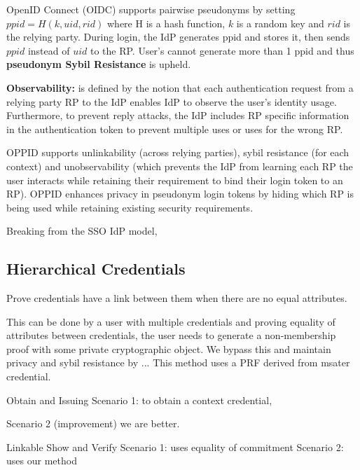 OpenID Connect (OIDC) supports pairwise pseudonyms by setting $ppid = H(k, uid, rid)$ where H is a hash function, $k$ is a random key and $rid$ is the relying party. During login, the IdP generates ppid and stores it, then sends $ppid$ instead of $uid$ to the RP. User's cannot generate more than 1 ppid and thus \textbf{pseudonym Sybil Resistance} is upheld. 

\textbf{Observability: } is defined by the notion that each authentication request from a relying party RP to the IdP enables IdP to observe the user's identity usage. Furthermore, to prevent reply attacks, the IdP includes RP specific information in the authentication token to prevent multiple uses or uses for the wrong RP.


OPPID \cite{kroschewski_oppid_2024} supports unlinkability (across relying parties), sybil resistance (for each context) and unobservability (which prevents the IdP from learning each RP the user interacts while retaining their requirement to bind their login token to an RP). OPPID enhances privacy in pseudonym login tokens by hiding which RP is being used while retaining existing security requirements.

Breaking from the SSO IdP model, 











\subsection{Hierarchical Credentials}





Prove credentials have a link between them when there are no equal attributes.


This can be done by a user with multiple credentials and proving equality of attributes between credentials, the user needs to generate a non-membership proof with some private cryptographic object. 
We bypass this and maintain privacy and sybil resistance by ...
This method uses a PRF derived from msater credential.

Obtain and Issuing
Scenario 1: to obtain a context credential, 

Scenario 2 (improvement) we are better.


Linkable Show and Verify
Scenario 1: uses equality of commitment
Scenario 2: uses our method

